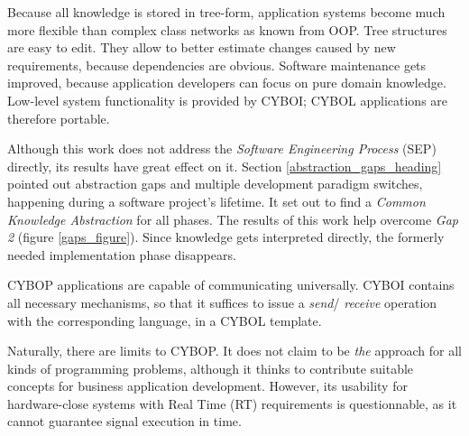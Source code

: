 Because all knowledge is stored in tree-form, application systems become much
more flexible than complex class networks as known from OOP. Tree structures
are easy to edit. They allow to better estimate changes caused by new
requirements, because dependencies are obvious. Software maintenance gets
improved, because application developers can focus on pure domain knowledge.
Low-level system functionality is provided by CYBOI; CYBOL applications are
therefore portable.

Although this work does not address the \emph{Software Engineering Process}
(SEP) directly, its results have great effect on it. Section
\ref{abstraction_gaps_heading} pointed out abstraction gaps and multiple
development paradigm switches, happening during a software project's lifetime.
It set out to find a \emph{Common Knowledge Abstraction} for all phases. The
results of this work help overcome \emph{Gap 2} (figure \ref{gaps_figure}).
Since knowledge gets interpreted directly, the formerly needed implementation
phase disappears.

CYBOP applications are capable of communicating universally. CYBOI contains all
necessary mechanisms, so that it suffices to issue a \emph{send}/
\emph{receive} operation with the corresponding language, in a CYBOL template.

Naturally, there are limits to CYBOP. It does not claim to be \emph{the}
approach for all kinds of programming problems, although it thinks to
contribute suitable concepts for business application development. However, its
usability for hardware-close systems with Real Time (RT) requirements is
questionnable, as it cannot guarantee signal execution in time.
